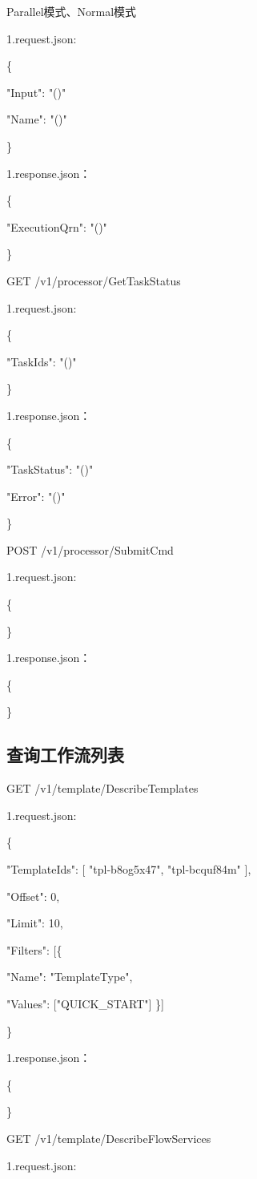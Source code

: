 Parallel模式、Normal模式

1.request.json:

\{

"Input": "\@exists()"

"Name": "\@notEmpty()"

\}


1.response.json：

\{

"ExecutionQrn": "\@notEmpty()"

\}



GET /v1/processor/GetTaskStatus

1.request.json:

\{

"TaskIds": "\@exists()"

\}


1.response.json：

\{

"TaskStatus": "\@exists()"

"Error": "\@notExists()"

\}

POST /v1/processor/SubmitCmd

1.request.json:

\{

\}

1.response.json：

\{

\}

\subsection{查询工作流列表}
GET /v1/template/DescribeTemplates

1.request.json:

\{

"TemplateIds": [
"tpl-b8og5x47",
"tpl-bcquf84m"
],

"Offset": 0,

"Limit": 10,

"Filters": [\{

    "Name": "TemplateType",

    "Values": ["QUICK\_START"]
\}]

\}


1.response.json：

\{

\}

GET /v1/template/DescribeFlowServices

1.request.json:

